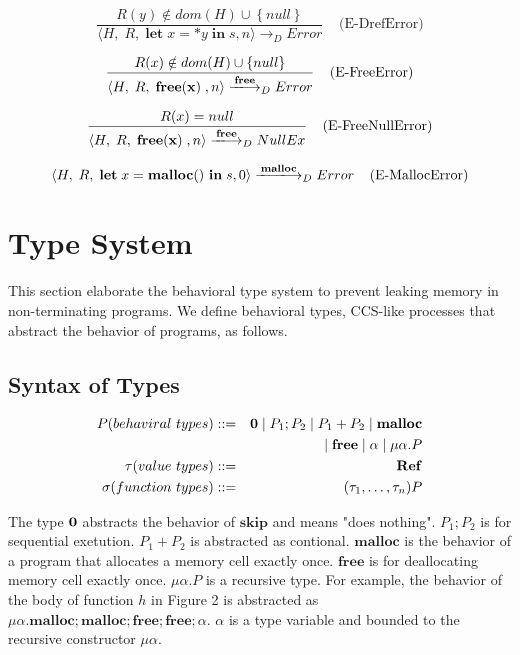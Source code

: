 \documentclass[english]{jssst_ppl} %
\newcommand\tB{\;|\;}
\newcommand\LET{\mathbf{let}\;}
\newcommand\FREE{\mathbf{free(x)}\;}
\newcommand\IN{\mathbf{in}\;}
\newcommand\SKIP{\mathbf{skip}}
\newcommand\Rtab{\; \; \; \;}
\newcommand\Lfc{\left\{}
\newcommand\Rfc{\right\}}
\newcommand\coma{,\;}
\newcommand\Malloc{\mathbf{malloc}}
\newcommand\Free{\mathbf{free}}
\begin{document}
$$
      \frac{R(y) \notin dom(H) \cup \Lfc null \Rfc}
           {\langle H\coma R\coma  \LET x  = *y \; \IN s, n \rangle
              \longrightarrow_{D}
                  Error }
      \Rtab \mbox{(E-DrefError)}
$$

%
$$
      \frac{R(x) \notin dom(H) \cup \Lfc null \Rfc}
            {\langle H\coma R\coma  \FREE , n \rangle
              \xlongrightarrow{\Free}_{D}
              Error }
     \Rtab \mbox{(E-FreeError)}
$$

%
$$
     \frac{R(x) =  null }
           {\langle H\coma R\coma  \FREE , n \rangle
             \xlongrightarrow{\Free}_{D} NullEx  }
      \Rtab \mbox{(E-FreeNullError)}
$$

$$
      \langle H\coma R\coma \LET x = \Malloc() \ \IN s ,  0  \rangle
      \xlongrightarrow{\Malloc}_{D}
      Error
      \Rtab \mbox{(E-MallocError)}
$$


\section{Type System}
This section elaborate the behavioral type system to prevent leaking memory in non-terminating programs. We define behavioral types, CCS-like processes that abstract the behavior of programs, as follows.
\subsection{Syntax of Types}
     \begin{eqnarray*}
       P (behaviral \ types)::=&& {\bf 0} \tB P_{1};P_{2} \tB P_{1}+P_{2} \tB \Malloc\\
       &&\tB \Free \tB \alpha \tB \mu\alpha.P \\
       \tau (value \ types)::=&&    \mathbf{Ref}  \\ %
       \sigma (function \ types)::=&& (\tau_{1},\dots, \tau_{n}) P
     \end{eqnarray*}

The type $\bf 0$ abstracts the behavior of $\SKIP$ and means "does nothing". $P_{1};P_{2}$ is for sequential exetution. $P_{1} + P_{2}$ is abstracted as contional. $\Malloc$ is the behavior of a program that allocates a memory cell exactly once. $\Free$ is for deallocating memory cell exactly once. $\mu \alpha. P$ is a recursive type. For example, the behavior of  the body of function $h$ in Figure 2 is abstracted as $\mu \alpha. \Malloc;\Malloc;\Free;\Free;\alpha$. $\alpha$ is a type variable and bounded to the recursive constructor $\mu \alpha$.
\end{document}
